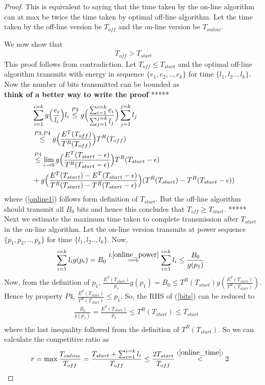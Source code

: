 \begin{proof}
This is equivalent to saying that the time taken by the on-line algorithm can at max be twice the time taken by optimal off-line algorithm. Let the time taken by the off-line version be $T_{off}$ and the on-line version be $T_{online}$. 

We now show that 
\begin{align}
T_{off} > T_{start}
\label{online_time}
\end{align}
This proof follows from contradiction. Let $T_{off}\le T_{start}$ and the optimal off-line algorithm transmits with energy in sequence $\{e_1,e_2,..,e_k\}$ for time $\{l_1,l_2..,l_k\} $. Now the number of bits transmitted can be bounded as
\\
\textbf{think of a better way to write the proof}
*****
\begin{align}
&\sum_{i=1}^{i=k} g\Big{(}\frac{e_i}{l_i}\Big{)}l_i\stackrel{P2}{\le} g\Big{(}\frac{\sum_{i=1}^{i=k}e_i}{\sum_{j=1}^{j=k}l_j}\Big{)} \sum_{j=1}^{j=k} l_j 
\\
&\stackrel{P3,P4}{\le} g\Big{(}\frac{E^T(T_{off})}{T^R(T_{off})}\Big{)} T^R(T_{off})
\\
&\stackrel{P4}{\le}\lim_{\epsilon \rightarrow 0} g\Big{(}\frac{E^T(T_{start}-\epsilon)}{T^R(T_{start}-\epsilon)}\Big{)} T^R(T_{start}-\epsilon)
\\
&+ g\Big{(}\frac{E^T(T_{start})-E^T(T_{start}-\epsilon)}{T^R(T_{start})-T^R(T_{start}-\epsilon)}\Big{)} (T^R(T_{start})-T^R(T_{start}-\epsilon)) \label{online1}
\end{align}
where (\ref{online1}) follows form definition of $T_{start}$. But the off-line algorithm should transmit all $B_0$ bits and hence this concludes that $T_{off}\ge T_{start}$.
*****
\\
Next we estimate the maximum time taken to complete transmission after $T_{start}$ in the on-line algorithm. Let the on-line version transmits at power sequence $\{p_1,p_2,..,p_k\}$ for time $\{l_1,l_2..,l_k\} $. Now,
\begin{align}
&\sum_{i=1}^{i=k}l_ig(p_i)=B_0\stackrel{L\ref{online_power}}{\implies}\sum_{i=1}^{i=k}l_i\le \frac{B_0}{g(p_1)}\label{bits}
\end{align}
Now, from the definition of $p_1$, $\frac{E^T(T_{start})}{p_1}g(p_1)=B_0 \le T^R(T_{start}) g(\frac{E^T(T_{start})}{T^R(T_{start})})$. Hence by property $P4$, $\frac{E^T(T_{start})}{T^R(T_{start})}\le p_1$. So, the RHS of (\ref{bits}) can be reduced to 
\begin{align}
&\frac{B_0}{g(p_1)} = \frac{E^T(T_{start})}{p_1} \le T^R(T_{start})\le T_{start}
\\
\end{align}
where the last inequality followed from the definition of $T^R(T_{start})$. So we can calculate the competitive ratio as
\begin{align*}
&r=\max\dfrac{T_{online}}{T_{off}} = \dfrac{T_{start}+\sum_{i=1}^{i=k}l_i}{T_{off}} \le \dfrac{2 T_{start}}{T_{off}} \stackrel{(\ref{online_time})}{<} 2
\end{align*}      
\end{proof}
